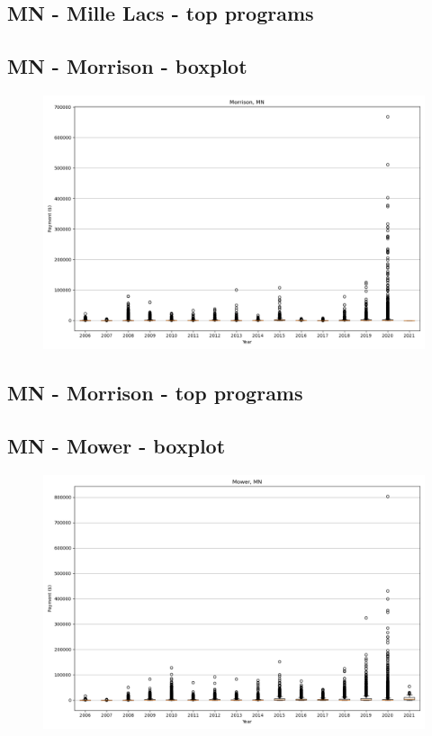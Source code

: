 \subsection*{MN - Mille Lacs - top programs}

\newpage
\subsection*{MN - Morrison - boxplot}
\begin{figure}[h]
\centering
\includegraphics[width=7in]{../output/boxplots/counties/Morrison-MN_boxplot.png}
\end{figure}


\subsection*{MN - Morrison - top programs}

\newpage
\subsection*{MN - Mower - boxplot}
\begin{figure}[h]
\centering
\includegraphics[width=7in]{../output/boxplots/counties/Mower-MN_boxplot.png}
\end{figure}


